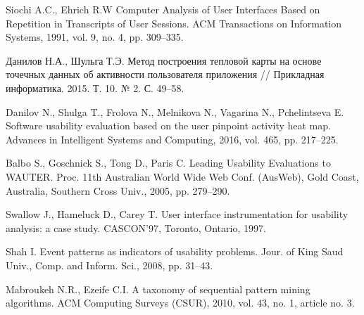 
\begin{thebibliography}{1}
	Siochi A.C., Ehrich R.W
	Computer Analysis of User Interfaces Based on Repetition in Transcripts of User Sessions.
	ACM Transactions on Information Systems, 1991, vol. 9, no. 4, pp. 309–335.
	
	Данилов Н.А., Шульга Т.Э.
	Метод построения тепловой карты на основе точечных данных об активности пользователя приложения
	// Прикладная информатика. 2015. Т. 10. № 2. С. 49–58.
	
	Danilov N., Shulga T., Frolova N., Melnikova N., Vagarina N., Pchelintseva E.
	Software usability evaluation based on the user pinpoint activity heat map.
	Advances in Intelligent Systems and Computing, 2016, vol. 465, pp. 217–225.
	
	Balbo S., Goschnick S., Tong D., Paris C.
	Leading Usability Evaluations to WAUTER.
	Proc. 11th Australian World Wide Web Conf. (AusWeb), Gold Coast, Australia, Southern Cross Univ., 2005,	pp. 279–290.
	
	Swallow J., Hameluck D., Carey T.
	User interface	instrumentation for usability analysis: a case study.
	CASCON’97, Toronto, Ontario, 1997.
	
	Shah I.
	Event patterns as indicators of usability problems.
	Jour. of King Saud Univ., Comp. and Inform. Sci., 2008, pp. 31–43.
	
	Mabroukeh N.R., Ezeife C.I.
	A taxonomy of sequential pattern mining algorithms.
	ACM Computing Surveys (CSUR), 2010,	vol. 43, no. 1, article no. 3.
	

\end{thebibliography}

